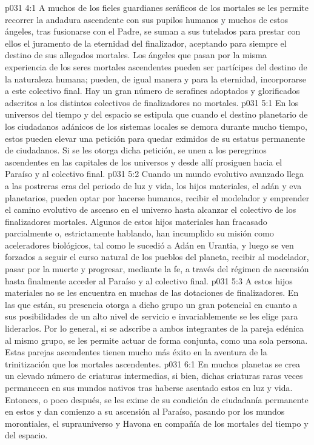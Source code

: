 \vs p031 4:1 A muchos de los fieles guardianes seráficos de los mortales se les permite recorrer la andadura ascendente con sus pupilos humanos y muchos de estos ángeles, tras fusionarse con el Padre, se suman a sus tutelados para prestar con ellos el juramento de la eternidad del finalizador, aceptando para siempre el destino de sus allegados mortales. Los ángeles que pasan por la misma experiencia de los seres mortales ascendentes pueden ser partícipes del destino de la naturaleza humana; pueden, de igual manera y para la eternidad, incorporarse a este colectivo final. Hay un gran número de serafines adoptados y glorificados adscritos a los distintos colectivos de finalizadores no mortales.
\vs p031 5:1 En los universos del tiempo y del espacio se estipula que cuando el destino planetario de los ciudadanos adánicos de los sistemas locales se demora durante mucho tiempo, estos pueden elevar una petición para quedar eximidos de su estatus permanente de ciudadanos. Si se les otorga dicha petición, se unen a los peregrinos ascendentes en las capitales de los universos y desde allí prosiguen hacia el Paraíso y al colectivo final.
\vs p031 5:2 Cuando un mundo evolutivo avanzado llega a las postreras eras del periodo de luz y vida, los hijos materiales, el adán y eva planetarios, pueden optar por hacerse humanos, recibir el modelador y emprender el camino evolutivo de ascenso en el universo hasta alcanzar el colectivo de los finalizadores mortales. Algunos de estos hijos materiales han fracasado parcialmente o, estrictamente hablando, han incumplido su misión como aceleradores biológicos, tal como le sucedió a Adán en Urantia, y luego se ven forzados a seguir el curso natural de los pueblos del planeta, recibir al modelador, pasar por la muerte y progresar, mediante la fe, a través del régimen de ascensión hasta finalmente acceder al Paraíso y al colectivo final.
\vs p031 5:3 A estos hijos materiales no se les encuentra en muchas de las dotaciones de finalizadores. En las que están, su presencia otorga a dicho grupo un gran potencial en cuanto a sus posibilidades de un alto nivel de servicio e invariablemente se les elige para liderarlos. Por lo general, si se adscribe a ambos integrantes de la pareja edénica al mismo grupo, se les permite actuar de forma conjunta, como una sola persona. Estas parejas ascendentes tienen mucho más éxito en la aventura de la trinitización que los mortales ascendentes.
\vs p031 6:1 En muchos planetas se crea un elevado número de criaturas intermedias, si bien, dichas criaturas raras veces permanecen en sus mundos nativos tras haberse asentado estos en luz y vida. Entonces, o poco después, se les exime de su condición de ciudadanía permanente en estos y dan comienzo a su ascensión al Paraíso, pasando por los mundos morontiales, el suprauniverso y Havona en compañía de los mortales del tiempo y del espacio.
